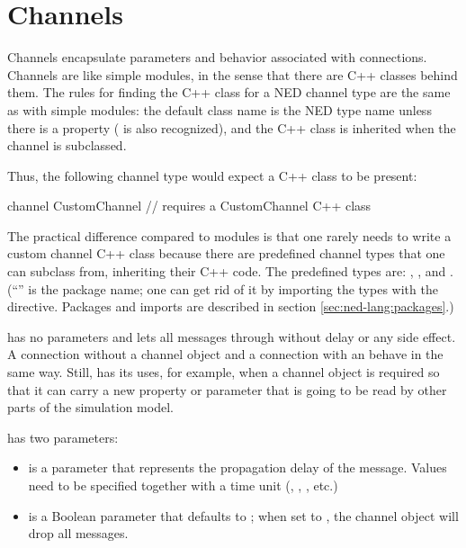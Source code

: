 \section{Channels}
\label{sec:ned-lang:channels}

Channels encapsulate parameters and behavior associated with connections.
Channels are like simple modules, in the sense that there are C++ classes
behind them. The rules for finding the C++ class for a NED channel type are
the same as with simple modules: the default class name is the NED type
name unless there is a  property ( is also
recognized), and the C++ class is inherited when the channel is subclassed.

Thus, the following channel type would expect a  C++ class
to be present:

\begin{ned}
channel CustomChannel  // requires a CustomChannel C++ class
{
}
\end{ned}

The practical difference compared to modules is that one rarely needs to write
a custom channel C++ class because there are predefined channel types that one can
subclass from, inheriting their C++ code. The predefined types are:
, , and .
(``'' is the package name; one can get rid of it by importing the types
with the  directive. Packages and imports are described in
section \ref{sec:ned-lang:packages}.)

 has no parameters and lets all messages through
without delay or any side effect. A connection without a channel object
and a connection with an  behave in the same way.
Still,  has its uses, for example, when a channel object
is required so that it can carry a new property or parameter that is
going to be read by other parts of the simulation model.

 has two parameters:

\begin{itemize}
    \item {} is a  parameter that represents the
          propagation delay of the message. Values need to be specified
          together with a time unit (, , , etc.)
    \item {} is a Boolean parameter that defaults to ;
          when set to , the channel object will drop all messages.
\end{itemize}

